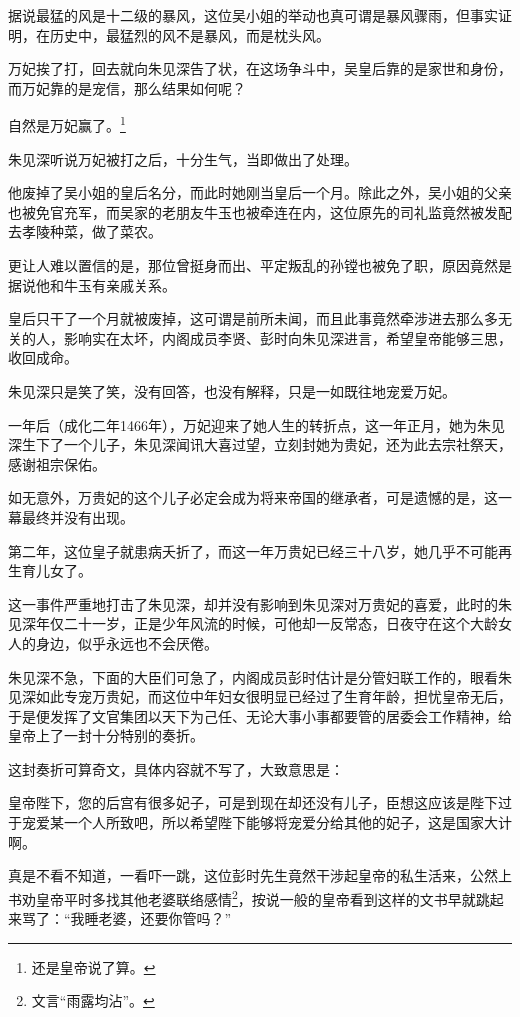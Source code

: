\begin{multicols}{\theparacolNo}
		据说最猛的风是十二级的暴风，这位吴小姐的举动也真可谓是暴风骤雨，但事实证明，在历史中，最猛烈的风不是暴风，而是枕头风。

		万妃挨了打，回去就向朱见深告了状，在这场争斗中，吴皇后靠的是家世和身份，而万妃靠的是宠信，那么结果如何呢？

		自然是万妃赢了。\footnote{还是皇帝说了算。}

		朱见深听说万妃被打之后，十分生气，当即做出了处理。

		他废掉了吴小姐的皇后名分，而此时她刚当皇后一个月。除此之外，吴小姐的父亲也被免官充军，而吴家的老朋友牛玉也被牵连在内，这位原先的司礼监竟然被发配去孝陵种菜，做了菜农。

		更让人难以置信的是，那位曾挺身而出、平定叛乱的孙镗也被免了职，原因竟然是据说他和牛玉有亲戚关系。

		皇后只干了一个月就被废掉，这可谓是前所未闻，而且此事竟然牵涉进去那么多无关的人，影响实在太坏，内阁成员李贤、彭时向朱见深进言，希望皇帝能够三思，收回成命。

		朱见深只是笑了笑，没有回答，也没有解释，只是一如既往地宠爱万妃。

		一年后（成化二年1466年），万妃迎来了她人生的转折点，这一年正月，她为朱见深生下了一个儿子，朱见深闻讯大喜过望，立刻封她为贵妃，还为此去宗社祭天，感谢祖宗保佑。

		如无意外，万贵妃的这个儿子必定会成为将来帝国的继承者，可是遗憾的是，这一幕最终并没有出现。

		第二年，这位皇子就患病夭折了，而这一年万贵妃已经三十八岁，她几乎不可能再生育儿女了。

		这一事件严重地打击了朱见深，却并没有影响到朱见深对万贵妃的喜爱，此时的朱见深年仅二十一岁，正是少年风流的时候，可他却一反常态，日夜守在这个大龄女人的身边，似乎永远也不会厌倦。

		朱见深不急，下面的大臣们可急了，内阁成员彭时估计是分管妇联工作的，眼看朱见深如此专宠万贵妃，而这位中年妇女很明显已经过了生育年龄，担忧皇帝无后，于是便发挥了文官集团以天下为己任、无论大事小事都要管的居委会工作精神，给皇帝上了一封十分特别的奏折。

		这封奏折可算奇文，具体内容就不写了，大致意思是：

		皇帝陛下，您的后宫有很多妃子，可是到现在却还没有儿子，臣想这应该是陛下过于宠爱某一个人所致吧，所以希望陛下能够将宠爱分给其他的妃子，这是国家大计啊。

		真是不看不知道，一看吓一跳，这位彭时先生竟然干涉起皇帝的私生活来，公然上书劝皇帝平时多找其他老婆联络感情\footnote{文言“雨露均沾”。}，按说一般的皇帝看到这样的文书早就跳起来骂了：“我睡老婆，还要你管吗？”


\end{multicols}
